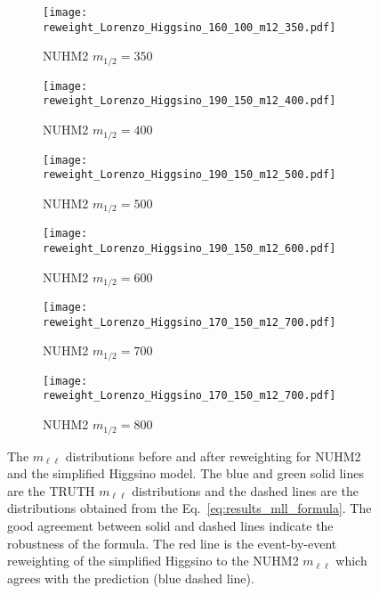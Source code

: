 \begin{figure}[htbp]
    \begin{center}
        \begin{subfigure}[b]{0.48\textwidth}
            \texttt{[image: reweight\_Lorenzo\_Higgsino\_160\_100\_m12\_350.pdf]}
            \caption{NUHM2 $m_{1/2}=350$~{\GeV}}
        \end{subfigure}
        \begin{subfigure}[b]{0.48\textwidth}
            \texttt{[image: reweight\_Lorenzo\_Higgsino\_190\_150\_m12\_400.pdf]}
            \caption{NUHM2 $m_{1/2}=400$~{\GeV}}
        \end{subfigure}
        \begin{subfigure}[b]{0.48\textwidth}
            \texttt{[image: reweight\_Lorenzo\_Higgsino\_190\_150\_m12\_500.pdf]}
            \caption{NUHM2 $m_{1/2}=500$~{\GeV}}
        \end{subfigure}
        \begin{subfigure}[b]{0.48\textwidth}
            \texttt{[image: reweight\_Lorenzo\_Higgsino\_190\_150\_m12\_600.pdf]}
            \caption{NUHM2 $m_{1/2}=600$~{\GeV}}
        \end{subfigure}
        \begin{subfigure}[b]{0.48\textwidth}
            \texttt{[image: reweight\_Lorenzo\_Higgsino\_170\_150\_m12\_700.pdf]}
            \caption{NUHM2 $m_{1/2}=700$~{\GeV}}
        \end{subfigure}
        \begin{subfigure}[b]{0.48\textwidth}
            \texttt{[image: reweight\_Lorenzo\_Higgsino\_170\_150\_m12\_700.pdf]}
            \caption{NUHM2 $m_{1/2}=800$~{\GeV}}
        \end{subfigure}
    \end{center}
    \caption{The $m_{\ell \ell}$ distributions before and after reweighting for NUHM2 and the simplified Higgsino model.
    The blue and green solid lines are the TRUTH $m_{\ell \ell}$ distributions and the dashed lines are the distributions obtained from the Eq.~\ref{eq:results_mll_formula}.
    The good agreement between solid and dashed lines indicate the robustness of the formula.
    The red line is the event-by-event reweighting of the simplified Higgsino to the NUHM2 $m_{\ell \ell}$ which agrees with the prediction (blue dashed line).}
    \label{fig:results_nuhm2_reweighting}
\end{figure}


